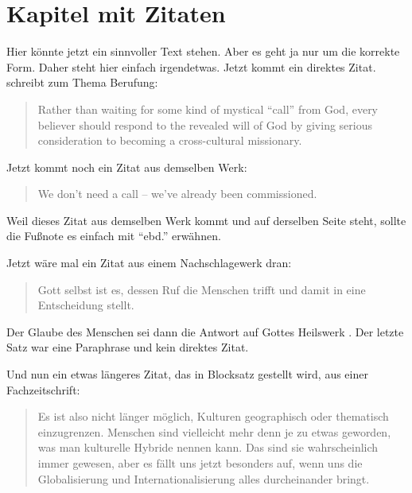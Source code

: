 \documentclass{scrreport}
\begin{document}


\chapter{Kapitel mit Zitaten}
Hier könnte jetzt ein sinnvoller Text stehen. Aber es geht ja nur um die korrekte Form. Daher steht hier einfach irgendetwas. Jetzt kommt ein direktes Zitat. \citeauthor*{friesen} schreibt zum Thema Berufung: \blockcquote[][330]{friesen}{Rather than waiting for some kind of mystical \enquote{call} from God, every believer should respond to the revealed will of God by giving serious consideration to becoming a cross-cultural missionary.} Jetzt kommt noch ein Zitat aus demselben Werk: \blockcquote[][330]{friesen}{We don't need a call -- we've already been commissioned.} Weil dieses Zitat aus demselben Werk kommt und auf derselben Seite steht, sollte die Fußnote es einfach mit \enquote{ebd.} erwähnen.

Jetzt wäre mal ein Zitat aus einem Nachschlagewerk dran: \blockcquote[][80]{rienecker}{Gott selbst ist es, dessen Ruf die Menschen trifft und damit in eine Entscheidung stellt.} Der Glaube des Menschen sei dann die Antwort auf Gottes Heilswerk \autocite[Vgl.][]{rienecker}. Der letzte Satz war eine Paraphrase und kein direktes Zitat.

Und nun ein etwas längeres Zitat, das in Blocksatz gestellt wird, aus einer Fachzeitschrift: \blockcquote[][]{dahl}{Es ist also nicht länger möglich, Kulturen geographisch oder thematisch einzugrenzen. Menschen sind vielleicht mehr denn je zu etwas geworden, was man kulturelle Hybride nennen kann. Das sind sie wahrscheinlich immer gewesen, aber es fällt uns jetzt besonders auf, wenn uns die Globalisierung und Internationalisierung alles durch\-einander bringt.}
\end{document}
